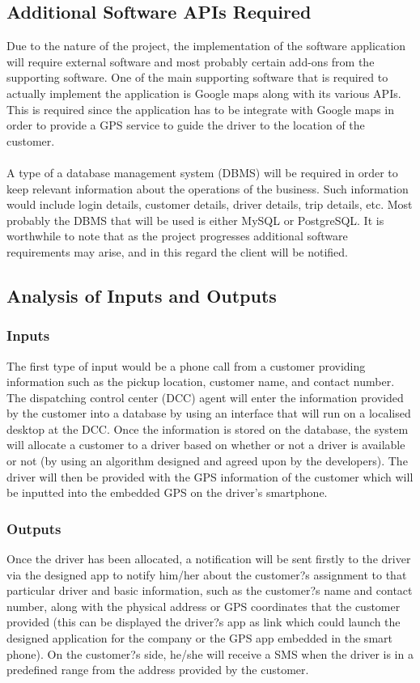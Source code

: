 \documentclass[a4paper,12pt]{article}
\begin{document}
\subsection{Additional Software APIs Required}
Due to the nature of the project, the implementation of the software application will require external software and most probably certain add-ons from the supporting software. One of the main supporting software that is required to actually implement the application is Google maps along with its various APIs. This is required since the application has to be integrate with Google maps in order to provide a GPS service to guide the driver to the location of the customer. \\\\
A type of a database management system (DBMS) will be required in order to keep relevant information about the operations of the business. Such information would include login details, customer details, driver details, trip details, etc. Most probably the DBMS that will be used is either MySQL or PostgreSQL. It is worthwhile to note that as the project progresses additional software requirements may arise, and in this regard the client will be notified.

\subsection{Analysis of Inputs and Outputs}
\subsubsection{Inputs}
The first type of input would be a phone call from a customer providing information such as the pickup location, customer name, and contact number. The dispatching control center (DCC) agent will enter the information provided by the customer into a database by using an interface that will run on a localised desktop at the DCC. Once the information is stored on the database, the system will allocate a customer to a driver based on whether or not a driver is available or not (by using an algorithm designed and agreed upon by the developers). The driver will then be provided with the GPS information of the customer which will be inputted into the embedded GPS on the driver's smartphone.

\subsubsection{Outputs}
Once the driver has been allocated, a notification will be sent firstly to the driver via the designed app to notify him/her about the customer?s assignment to that particular driver and basic information, such as the customer?s name and contact number, along with the physical address or GPS coordinates that the customer provided (this can be displayed the driver?s app as link which could launch the designed application for the company or the GPS app embedded in the smart phone). On the customer?s side, he/she will receive a SMS when the driver is in a predefined range from the address provided by the customer.
\end{document}
